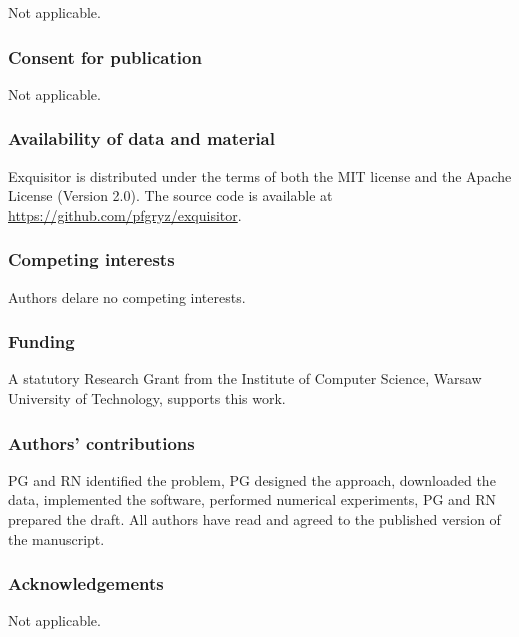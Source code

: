 \documentclass[pdflatex,sn-vancouver-num]{sn-jnl}%
\begin{document}
Not applicable.

\subsubsection*{Consent for publication}

Not applicable.

\subsubsection*{Availability of data and material}

Exquisitor is distributed under the terms of both the MIT license and the Apache License (Version 2.0).
The source code is available at \url{https://github.com/pfgryz/exquisitor}.

\subsubsection*{Competing interests}

Authors delare no competing interests.

\subsubsection*{Funding}

A statutory Research Grant from the Institute of Computer Science, Warsaw University of Technology, supports this work.

\subsubsection*{Authors' contributions}

PG and RN identified the problem, PG designed the approach, downloaded the data, implemented the software, performed numerical experiments, PG and RN prepared the draft. All authors have read and agreed to the published version of the manuscript.

\subsubsection*{Acknowledgements}

Not applicable.



    \backmatter


    
\end{document}
